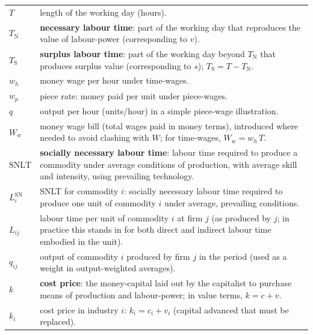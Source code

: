 \begin{longtable}{@{}>{\centering\arraybackslash}p{}@{\hspace{8pt}}%
                  >{\raggedright\arraybackslash}p{}@{}}
$T$ &
length of the working day (hours). \\

$T_{\mathrm{N}}$ &
\textbf{necessary labour time}: part of the working day that reproduces the value of labour-power (corresponding to $v$). \\

$T_{\mathrm{S}}$ &
\textbf{surplus labour time}: part of the working day beyond $T_{\mathrm{N}}$ that produces surplus value (corresponding to $s$); $T_{\mathrm{S}} = T - T_{\mathrm{N}}$. \\

$w_h$ &
money wage per hour under time-wages. \\

$w_p$ &
piece rate: money paid per unit under piece-wages. \\

$q$ &
output per hour (units/hour) in a simple piece-wage illustration. \\

$W_w$ &
money wage bill (total wages paid in money terms), introduced where needed to avoid clashing with $W$; for time-wages, $W_w = w_h\,T$. \\

$\mathrm{SNLT}$ &
\textbf{socially necessary labour time}: labour time required to produce a commodity under average conditions of production, with average skill and intensity, using prevailing technology. \\

$L^{\mathrm{SN}}_i$ &
SNLT for commodity $i$: socially necessary labour time required to produce one unit of commodity $i$ under average, prevailing conditions. \\

$L_{ij}$ &
labour time per unit of commodity $i$ at firm $j$ (as produced by $j$; in practice this stands in for both direct and indirect labour time embodied in the unit). \\

$q_{ij}$ &
output of commodity $i$ produced by firm $j$ in the period (used as a weight in output-weighted averages). \\

$k$ &
\textbf{cost price}: the money-capital laid out by the capitalist to purchase means of production and labour-power; in value terms, $k = c+v$. \\

$k_i$ &
cost price in industry $i$: $k_i = c_i + v_i$ (capital advanced that must be replaced). \\


\end{longtable}
